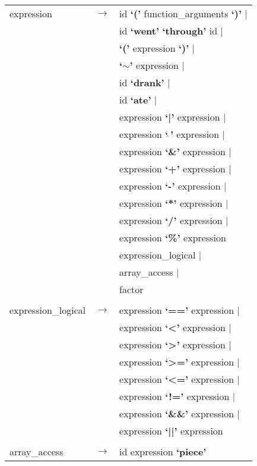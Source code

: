 \documentclass[landscape]{article}
\begin{document}
\begin{longtable}{ l c l}
    expression & \ensuremath{\to} &  id \textbf{`('} function\_arguments  \textbf{`)'}  | \\
    & &  id \textbf{`went'} \textbf{`through'} id | \\
    & &  \textbf{`('} expression  \textbf{`)'}  | \\
    & &  \textbf{`$\sim$'} expression   | \\
    & &  id \textbf{`drank'}  | \\
    & &  id \textbf{`ate'}  | \\
    & &  expression  \textbf{`|'} expression   | \\
    & &  expression  \textbf{`$\hat{\ }$'} expression   | \\
    & &  expression  \textbf{`\&'} expression   | \\
    & &  expression  \textbf{`+'} expression   | \\
    & &  expression  \textbf{`-'} expression   | \\
    & &  expression  \textbf{`*'} expression   | \\
    & &  expression  \textbf{`/'} expression   | \\
    & &  expression  \textbf{`\%'} expression    \\
    & &  expression\_logical |   \\
    & &  array\_access | \\
    & &  factor    \\

    \\

    expression\_logical & \ensuremath{\to} &  expression  \textbf{`=='} expression   | \\
    & &  expression  \textbf{`<'} expression   | \\
    & &  expression  \textbf{`>'} expression   | \\
    & &  expression  \textbf{`>='} expression   | \\
    & &  expression  \textbf{`<='} expression   | \\
    & &  expression  \textbf{`!='} expression   | \\
    & &  expression  \textbf{`\&\&'} expression   | \\
    & &  expression  \textbf{`||'} expression    \\

    \\

    array\_access & \ensuremath{\to} &  id expression  \textbf{`piece'}  \\


\end{longtable}
\end{document}

